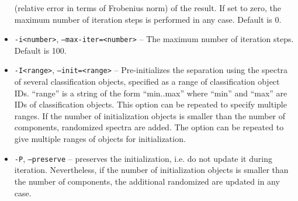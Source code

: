 \begin{itemize}
    (relative error in terms of Frobenius norm) of the result. If set to zero,
    the maximum number of iteration steps is performed in any case. Default is
    0.
  \item {\tt -i<number>}, {\tt --max-iter=<number>} -- The maximum number of
    iteration steps. Default is 100.
  \item {\tt -I<range>}, {\tt --init=<range>} -- Pre-initializes the
    separation using the spectra of several classification objects,
    specified as a range of classification object IDs. ``range'' is a
    string of the form ``min..max'' where ``min'' and ``max'' are IDs of
    classification objects. This option can be repeated to specify multiple
    ranges. If the number of initialization objects is smaller than the
    number of components, randomized spectra are added. The option can be 
    repeated to give multiple ranges of objects for initialization.
  \item {\tt -P}, {\tt --preserve} -- preserves the initialization, i.e. do
    not update it during iteration. Nevertheless, if the number of
    initialization objects is smaller than the number of components, the
    additional randomized are updated in any case.
\end{itemize}

